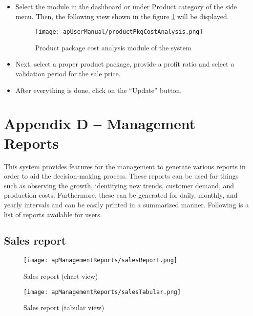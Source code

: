 \documentclass[12pt]{report}
\begin{document}
\begin{itemize}
	\item Select the module in the dashboard or under Product category of the side menu. Then, the following view shown in the figure \ref{fig:apUserManual_productPkgCostAnalysis} will be displayed.
	      \begin{figure}[H]
		      \centering
		      \texttt{[image: apUserManual/productPkgCostAnalysis.png]}
		      \caption{Product package cost analysis module of the system}
		      \label{fig:apUserManual_productPkgCostAnalysis}
	      \end{figure}

	\item Next, select a proper product package, provide a profit ratio and select a validation period for the sale price.
	\item After everything is done, click on the ``Update'' button.
\end{itemize}

\setcounter{chapter}{4}
\setcounter{section}{0}
\setcounter{figure}{0}
\chapter*{\Huge Appendix D – Management Reports}
This system provides features for the management to generate various reports in order to aid the decision-making process. These reports can be used for things such as observing the growth, identifying new trends, customer demand, and production costs. Furthermore, these can be generated for daily, monthly, and yearly intervals and can be easily printed in a summarized manner. Following is a list of reports available for users.

\section{Sales report}
\begin{figure}[H]
	\centering
	\texttt{[image: apManagementReports/salesReport.png]}
	\caption{Sales report (chart view)}
\end{figure}

\begin{figure}[H]
	\centering
	\texttt{[image: apManagementReports/salesTabular.png]}
	\caption{Sales report (tabular view)}
\end{figure}
\end{document}
